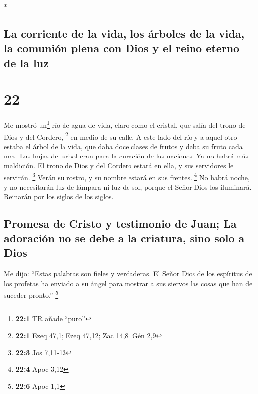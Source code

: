 \begin{paracol}{2}
\begin{otherlanguage}{english}
\end{otherlanguage}

\switchcolumn[0]*

\hypertarget{la-corriente-de-la-vida-los-uxe1rboles-de-la-vida-la-comuniuxf3n-plena-con-dios-y-el-reino-eterno-de-la-luz}{%
\subsection{La corriente de la vida, los árboles de la vida, la comunión
plena con Dios y el reino eterno de la
luz}\label{la-corriente-de-la-vida-los-uxe1rboles-de-la-vida-la-comuniuxf3n-plena-con-dios-y-el-reino-eterno-de-la-luz}}

\hypertarget{section-42}{%
\section{22}\label{section-42}}

 Me mostró un\footnote{\textbf{22:1} TR añade ``puro''}
río de agua de vida, claro como el cristal, que salía del trono de Dios
y del Cordero, \footnote{\textbf{22:1} Ezeq 47,1; Ezeq 47,12; Zac 14,8;
  Gén 2,9}  en medio de su calle. A este lado del río y a
aquel otro estaba el árbol de la vida, que daba doce clases de frutos y
daba su fruto cada mes. Las hojas del árbol eran para la curación de las
naciones.  Ya no habrá más maldición. El trono de Dios y
del Cordero estará en ella, y sus servidores le servirán. \footnote{\textbf{22:3}
  Jos 7,11-13}  Verán su rostro, y su nombre estará en sus
frentes. \footnote{\textbf{22:4} Apoc 3,12}  No habrá
noche, y no necesitarán luz de lámpara ni luz de sol, porque el Señor
Dios los iluminará. Reinarán por los siglos de los siglos.

\hypertarget{promesa-de-cristo-y-testimonio-de-juan-la-adoraciuxf3n-no-se-debe-a-la-criatura-sino-solo-a-dios}{%
\subsection{Promesa de Cristo y testimonio de Juan; La adoración no se
debe a la criatura, sino solo a
Dios}\label{promesa-de-cristo-y-testimonio-de-juan-la-adoraciuxf3n-no-se-debe-a-la-criatura-sino-solo-a-dios}}

 Me dijo: ``Estas palabras son fieles y verdaderas. El
Señor Dios de los espíritus de los profetas ha enviado a su ángel para
mostrar a sus siervos las cosas que han de suceder pronto.'' \footnote{\textbf{22:6}
  Apoc 1,1}


\end{paracol}
